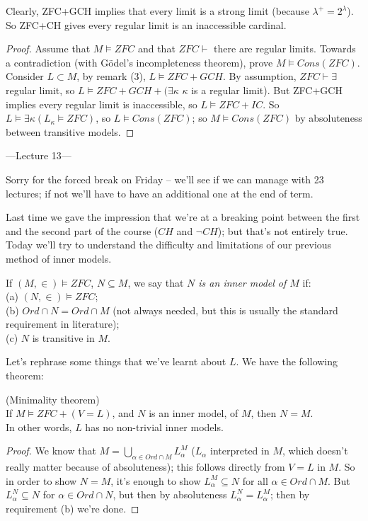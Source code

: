 \documentclass[a4paper]{article}
\begin{document}
Clearly, ZFC+GCH implies that every limit is a strong limit (because $\lambda^+ = 2^\lambda$). So ZFC+CH gives every regular limit is an inaccessible cardinal.
\begin{proof}
Assume that $M \vDash ZFC$ and that $ZFC\vdash$ there are regular limits. Towards a contradiction (with G\"{o}del's incompleteness theorem), prove $M \vDash Cons(ZFC)$.\\
Consider $L \subset M$, by remark (3), $L \vDash ZFC+GCH$. By assumption, $ZFC \vdash \exists$ regular limit, so $L \vDash ZFC+GCH+(\exists \kappa$ $\kappa$ is a regular limit). But ZFC+GCH implies every regular limit is inaccessible, so $L \vDash ZFC+IC$. So $L \vDash \exists \kappa (L_\kappa \vDash ZFC)$, so $L \vDash Cons(ZFC)$; so $M \vDash Cons(ZFC)$ by absoluteness between transitive models.
\end{proof}

---Lecture 13---

Sorry for the forced break on Friday -- we'll see if we can manage with 23 lectures; if not we'll have to have an additional one at the end of term.

Last time we gave the impression that we're at a breaking point between the first and the second part of the course ($CH$ and $\neg CH$); but that's not entirely true. Today we'll try to understand the difficulty and limitations of our previous method of inner models.

\begin{defi}
If $(M,\in) \vDash ZFC$, $N \subseteq M$, we say that \emph{$N$ is an inner model of $M$} if:\\
(a) $(N,\in) \vDash ZFC$;\\
(b) $Ord \cap N = Ord \cap M$ (not always needed, but this is usually the standard requirement in literature);\\
(c) $N$ is transitive in $M$.
\end{defi}

Let's rephrase some things that we've learnt about $L$. We have the following theorem:

\begin{thm} (Minimality theorem)\\
If $M \vDash ZFC+(V=L)$, and $N$ is an inner model, of $M$, then $N=M$.\\
In other words, $L$ has no non-trivial inner models.
\begin{proof}
We know that $M=\bigcup_{\alpha \in Ord \cap M} L_\alpha^M$ ($L_\alpha$ interpreted in $M$, which doesn't really matter because of absoluteness); this follows directly from $V=L$ in $M$. So in order to show $N=M$, it's enough to show $L_\alpha^M \subseteq N$ for all $\alpha \in Ord \cap M$. But $L_\alpha^N \subseteq N$ for $\alpha \in Ord \cap N$, but then by absoluteness $L_\alpha^N = L_\alpha^M$; then by requirement (b) we're done.
\end{proof}
\end{thm}
\end{document}
